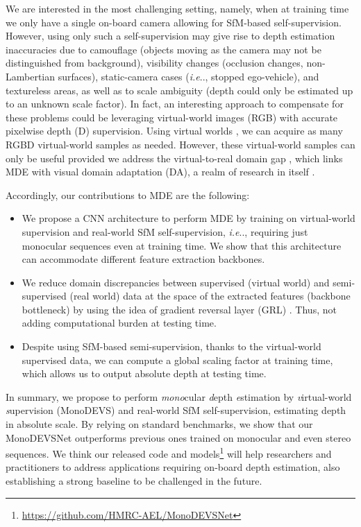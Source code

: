\documentclass[journal]{IEEEtran}
\makeatletter
\DeclareRobustCommand\onedot{\futurelet\@let@token\@onedot}
\def\@onedot{\ifx\@let@token.\else.\null\fi\xspace}
\def\ie{\emph{i.e}\onedot} \def\Ie{\emph{I.e}\onedot}
\makeatother
\begin{document}
We are interested in the most challenging setting, namely, when at training time we only have a single on-board camera allowing for SfM-based self-supervision. However, using only such a self-supervision may give rise to depth estimation inaccuracies due to camouflage (objects moving as the camera may not be distinguished from background), visibility changes (occlusion changes, non-Lambertian surfaces), static-camera cases ({\ie}, stopped ego-vehicle), and textureless areas, as well as to scale ambiguity (depth could only be estimated up to an unknown scale factor). In fact, an interesting approach to compensate for these problems could be leveraging virtual-world images (RGB) with accurate pixelwise depth (D) supervision. Using virtual worlds \cite{Gaidon:2016, Cabon:2020, Ros:2016, Mayer:2016, Richter:2017, Shah:2017, Dosovitskiy:2017}, we can acquire as many RGBD virtual-world samples as needed. However, these virtual-world samples can only be useful provided we address the virtual-to-real domain gap \cite{Zheng:2018T2Net, Kundu:2018AdaDepth, Zhao:2019GASDA, Pnvr:2020SharinGAN, Cheng:2020S3Net}, which links MDE with visual domain adaptation (DA), a realm of research in itself \cite{Csurka:2017, Wang-Deng:2018, Wilson:2020}. 

Accordingly, our contributions to MDE are the following:
\begin{itemize}
\item We propose a CNN architecture to perform MDE by training on virtual-world supervision and real-world SfM self-supervision, {\ie}, requiring just monocular sequences even at training time. We show that this architecture can accommodate different feature extraction backbones. 

\item We reduce domain discrepancies between supervised (virtual world) and semi-supervised (real world) data at the space of the extracted features (backbone bottleneck) by using the idea of gradient reversal layer (GRL) \cite{Ganin:2015, Ganin:2016}. Thus, not adding computational burden at testing time. 

\item Despite using SfM-based semi-supervision, thanks to the virtual-world supervised data, we can compute a global scaling factor at training time, which allows us to output absolute depth at testing time. 
\end{itemize}

In summary, we propose to perform \emph{mono}cular \emph{d}epth \emph{e}stimation by \emph{v}irtual-world \emph{s}upervision (MonoDEVS) and real-world SfM self-supervision, estimating depth in absolute scale. By relying on standard benchmarks, we show that our MonoDEVSNet outperforms previous ones trained on monocular and even stereo sequences. We think our released code and models\footnote{\href{https://github.com/HMRC-AEL/MonoDEVSNet}{https://github.com/HMRC-AEL/MonoDEVSNet}} will help researchers and practitioners to address applications requiring on-board depth estimation, also establishing a strong baseline to be challenged in the future.
\end{document}

